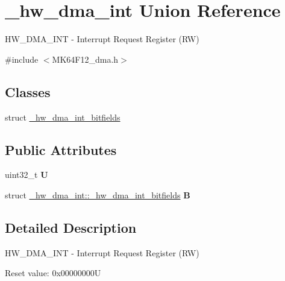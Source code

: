 \hypertarget{union__hw__dma__int}{}\section{\+\_\+hw\+\_\+dma\+\_\+int Union Reference}
\label{union__hw__dma__int}


H\+W\+\_\+\+D\+M\+A\+\_\+\+I\+NT -\/ Interrupt Request Register (RW)  




{\ttfamily \#include $<$M\+K64\+F12\+\_\+dma.\+h$>$}

\subsection*{Classes}
\begin{DoxyCompactItemize}
\item 
struct \hyperlink{struct__hw__dma__int_1_1__hw__dma__int__bitfields}{\+\_\+hw\+\_\+dma\+\_\+int\+\_\+bitfields}
\end{DoxyCompactItemize}
\subsection*{Public Attributes}
\begin{DoxyCompactItemize}
\item 
uint32\+\_\+t {\bfseries U}\hypertarget{union__hw__dma__int_acc83b3901728c131850e582d3789e651}{}\label{union__hw__dma__int_acc83b3901728c131850e582d3789e651}

\item 
struct \hyperlink{struct__hw__dma__int_1_1__hw__dma__int__bitfields}{\+\_\+hw\+\_\+dma\+\_\+int\+::\+\_\+hw\+\_\+dma\+\_\+int\+\_\+bitfields} {\bfseries B}\hypertarget{union__hw__dma__int_ae5056b07b4eefe190bb57e2d576363a5}{}\label{union__hw__dma__int_ae5056b07b4eefe190bb57e2d576363a5}

\end{DoxyCompactItemize}


\subsection{Detailed Description}
H\+W\+\_\+\+D\+M\+A\+\_\+\+I\+NT -\/ Interrupt Request Register (RW) 

Reset value\+: 0x00000000U

